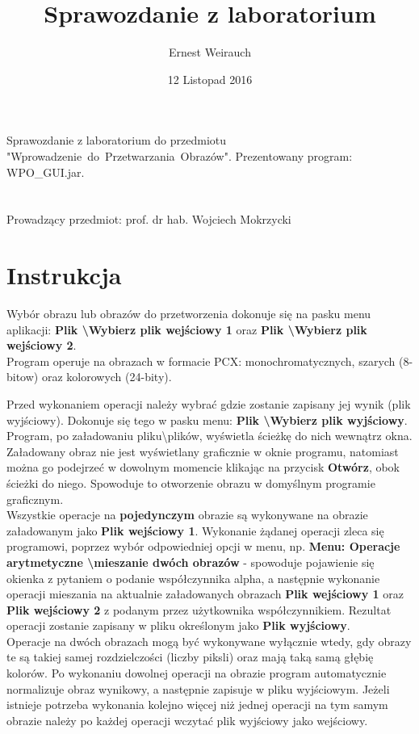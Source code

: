 \documentclass{article}
\title{Sprawozdanie z laboratorium}
\author{Ernest Weirauch}
\date{12 Listopad 2016}
\begin{document}
\maketitle	%
Sprawozdanie z laboratorium do przedmiotu "Wprowadzenie~do~Przetwarzania~Obrazów".	%
Prezentowany program: WPO\_GUI.jar.\\
\\ \\
Prowadzący przedmiot: prof. dr hab. Wojciech Mokrzycki
\\
\section{Instrukcja}
Wybór obrazu lub obrazów do przetworzenia dokonuje się na pasku menu aplikacji: \textbf{Plik \textbackslash Wybierz plik wejściowy 1} oraz  \textbf{Plik \textbackslash Wybierz plik wejściowy 2}. \\
Program operuje na obrazach w formacie PCX: monochromatycznych, szarych (8-bitow) oraz kolorowych (24-bity). 

Przed wykonaniem operacji należy wybrać gdzie zostanie zapisany jej wynik (plik wyjściowy). Dokonuje się tego w pasku menu: \textbf{Plik \textbackslash Wybierz plik wyjściowy}.\\
Program, po załadowaniu pliku\textbackslash plików, wyświetla ścieżkę do nich wewnątrz okna. Załadowany obraz nie jest wyświetlany graficznie w oknie programu, natomiast można go podejrzeć w dowolnym momencie klikając na przycisk \textbf{Otwórz}, obok ścieżki do niego. Spowoduje to otworzenie obrazu w domyślnym programie graficznym.
\\
Wszystkie operacje na \textbf{pojedynczym} obrazie są wykonywane na obrazie załadowanym jako \textbf{Plik wejściowy 1}. 
Wykonanie żądanej operacji zleca się programowi, poprzez wybór odpowiedniej opcji w menu, np. \textbf{Menu: Operacje arytmetyczne \textbackslash mieszanie dwóch obrazów} - spowoduje pojawienie się okienka z pytaniem o podanie współczynnika alpha, a następnie wykonanie operacji mieszania na aktualnie załadowanych obrazach \textbf{Plik wejściowy 1} oraz \textbf{Plik wejściowy 2} z podanym przez użytkownika współczynnikiem. Rezultat operacji zostanie zapisany w pliku określonym jako \textbf{Plik wyjściowy}.
\\
Operacje na dwóch obrazach mogą być wykonywane wyłącznie wtedy, gdy obrazy te są takiej samej rozdzielczości (liczby piksli) oraz mają taką samą głębię kolorów. 
Po wykonaniu dowolnej operacji na obrazie program automatycznie normalizuje obraz wynikowy, a następnie zapisuje w pliku wyjściowym. Jeżeli istnieje potrzeba wykonania kolejno więcej niż jednej operacji na tym samym obrazie należy po każdej operacji wczytać plik wyjściowy jako wejściowy.
\end{document}
